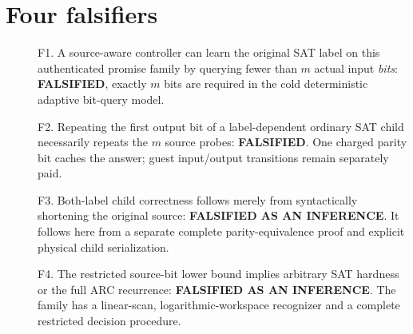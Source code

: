 \documentclass[11pt]{article}
\begin{document}
\section{Four falsifiers}
\begin{description}
\item[] F1. A source-aware controller can learn the original SAT label on this authenticated promise family by querying fewer than $m$ actual input \emph{bits}: \textbf{FALSIFIED}, exactly $m$ bits are required in the cold deterministic adaptive bit-query model.
\item[] F2. Repeating the first output bit of a label-dependent ordinary SAT child necessarily repeats the $m$ source probes: \textbf{FALSIFIED}. One charged parity bit caches the answer; guest input/output transitions remain separately paid.
\item[] F3. Both-label child correctness follows merely from syntactically shortening the original source: \textbf{FALSIFIED AS AN INFERENCE}. It follows here from a separate complete parity-equivalence proof and explicit physical child serialization.
\item[] F4. The restricted source-bit lower bound implies arbitrary SAT hardness or the full ARC recurrence: \textbf{FALSIFIED AS AN INFERENCE}. The family has a linear-scan, logarithmic-workspace recognizer and a complete restricted decision procedure.
\end{description}
\end{document}
